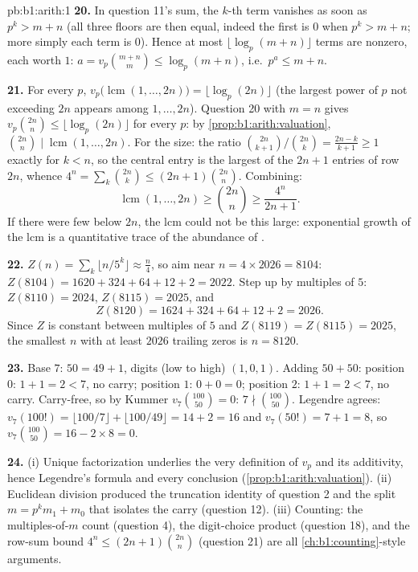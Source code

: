 \begin{solution}{pb:b1:arith:1}
\textbf{20.} In question 11's sum, the $k$-th term vanishes as
soon as $p^k > m + n$ (all three floors are then equal, indeed the
first is $0$ when $p^k > m+n$; more simply each term is $0$).
Hence at most $\lfloor \log_p(m+n)\rfloor$ terms are nonzero, each
worth $1$: $a = v_p\binom{m+n}m \leq \log_p(m+n)$, i.e.\ $p^a \leq
m + n$.

\textbf{21.} For every  $p$, $v_p\bigl(\operatorname{lcm}(1,
\dots, 2n)\bigr) = \lfloor\log_p(2n)\rfloor$ (the largest power of
$p$ not exceeding $2n$ appears among $1, \dots, 2n$). Question 20
with $m = n$ gives $v_p\binom{2n}n \leq \lfloor\log_p(2n)\rfloor$
for every $p$: by \cref{prop:b1:arith:valuation}, $\binom{2n}n
\mid \operatorname{lcm}(1, \dots, 2n)$. For the size: the ratio
$\binom{2n}{k+1}/\binom{2n}k = \frac{2n-k}{k+1} \geq 1$ exactly
for $k < n$, so the central entry is the largest of the $2n + 1$
entries of row $2n$, whence $4^n = \sum_k \binom{2n}k \leq
(2n+1)\binom{2n}n$. Combining:
\[
\operatorname{lcm}(1, \dots, 2n) \geq \binom{2n}n \geq
\frac{4^n}{2n + 1} .
\]
If there were few  below $2n$, the lcm could not be this
large: exponential growth of the lcm is a quantitative trace of
the abundance of .

\textbf{22.} $Z(n) = \sum_k\lfloor n/5^k\rfloor \approx \frac
n4$, so aim near $n = 4 \times 2026 = 8104$: $Z(8104) = 1620 +
324 + 64 + 12 + 2 = 2022$. Step up by multiples of $5$: $Z(8110)
= 2024$, $Z(8115) = 2025$, and
\[
Z(8120) = 1624 + 324 + 64 + 12 + 2 = 2026 .
\]
Since $Z$ is constant between multiples of $5$ and $Z(8119) =
Z(8115) = 2025$, the smallest $n$ with at least $2026$ trailing
zeros is $n = 8120$.

\textbf{23.} Base $7$: $50 = 49 + 1$, digits (low to high) $(1, 0,
1)$. Adding $50 + 50$: position $0$: $1 + 1 = 2 < 7$, no carry;
position $1$: $0 + 0 = 0$; position $2$: $1 + 1 = 2 < 7$, no
carry. Carry-free, so by Kummer $v_7\binom{100}{50} = 0$: $7 \nmid
\binom{100}{50}$. Legendre agrees: $v_7(100!) = \lfloor 100/7
\rfloor + \lfloor 100/49 \rfloor = 14 + 2 = 16$ and $v_7(50!) = 7
+ 1 = 8$, so $v_7\binom{100}{50} = 16 - 2\times8 = 0$.

\textbf{24.} (i) Unique factorization underlies the very
definition of $v_p$ and its additivity, hence Legendre's formula
and every  conclusion
(\cref{prop:b1:arith:valuation}). (ii) Euclidean division produced
the truncation identity of question 2 and the split $m = p^km_1 +
m_0$ that isolates the carry (question 12). (iii) Counting: the
multiples-of-$m$ count (question 4), the digit-choice product
(question 18), and the row-sum bound $4^n \leq
(2n+1)\binom{2n}n$ (question 21) are all
\cref{ch:b1:counting}-style arguments.


\end{solution}

